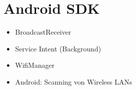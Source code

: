 \section{Android SDK}
\begin{itemize}
\item BroadcastReceiver
\item Service Intent (Background)
\item WifiManager
\item Android: Scanning von Wireless LANs
\end{itemize}